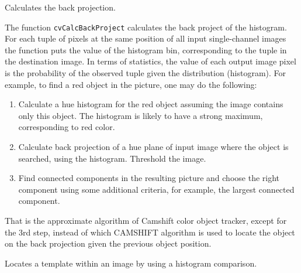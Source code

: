 \label{CalcBackProject}

Calculates the back projection.


\begin{description}
\end{description}

The function \texttt{cvCalcBackProject} calculates the back project of the histogram. For each tuple of pixels at the same position of all input single-channel images the function puts the value of the histogram bin, corresponding to the tuple in the destination image. In terms of statistics, the value of each output image pixel is the probability of the observed tuple given the distribution (histogram). For example, to find a red object in the picture, one may do the following:

\begin{enumerate}
 \item Calculate a hue histogram for the red object assuming the image contains only this object. The histogram is likely to have a strong maximum, corresponding to red color.
 \item Calculate back projection of a hue plane of input image where the object is searched, using the histogram. Threshold the image.
 \item Find connected components in the resulting picture and choose the right component using some additional criteria, for example, the largest connected component.
\end{enumerate}

That is the approximate algorithm of Camshift color object tracker, except for the 3rd step, instead of which CAMSHIFT algorithm is used to locate the object on the back projection given the previous object position.

\label{CalcBackProjectPatch}

Locates a template within an image by using a histogram comparison.


